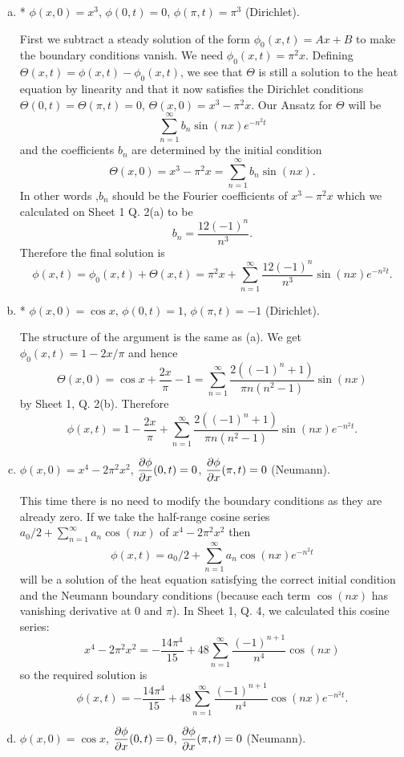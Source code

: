 \documentclass[12pt]{article}
\begin{document}
\iffalse
\begin{answer}
\begin{enumerate}[(a)]
\item * $\phi(x,0)=x^3$, $\phi(0,t)=0$, $\phi(\pi,t)=\pi^3$ (Dirichlet).

First we subtract a steady solution of the form $\phi_0(x,t)=Ax+B$ to make the boundary conditions vanish. We need $\phi_0(x,t)=\pi^2x$. Defining $\Theta(x,t)=\phi(x,t)-\phi_0(x,t)$, we see that $\Theta$ is still a solution to the heat equation by linearity and that it now satisfies the Dirichlet conditions $\Theta(0,t)=\Theta(\pi,t)=0$, $\Theta(x,0)=x^3-\pi^2x$.
Our Ansatz for $\Theta$ will be
\[\sum_{n=1}^{\infty}b_n\sin(nx)e^{-n^2t}\]
and the coefficients $b_n$ are determined by the initial condition
\[\Theta(x,0)=x^3-\pi^2x=\sum_{n=1}^{\infty}b_n\sin(nx).\]
In other words ,$b_n$ should be the Fourier coefficients of $x^3-\pi^2x$ which we calculated on Sheet 1 Q. 2(a) to be
\[b_n=\frac{12(-1)^n}{n^3}.\]
Therefore the final solution is
\[\phi(x,t)=\phi_0(x,t)+\Theta(x,t)=\pi^2x+\sum_{n=1}^{\infty}\frac{12(-1)^n}{n^3}\sin(nx)e^{-n^2t}.\]
\item * $\phi(x,0)=\cos x$, $\phi(0,t)=1$, $\phi(\pi,t)=-1$ (Dirichlet).

The structure of the argument is the same as (a). We get $\phi_0(x,t)=1-2x/\pi$ and hence
\[\Theta(x,0)=\cos x+\frac{2x}{\pi}-1=\sum_{n=1}^{\infty}\frac{2((-1)^n+1)}{\pi n(n^2-1)}\sin(nx)\]
by Sheet 1, Q. 2(b). Therefore
\[\phi(x,t)=1-\frac{2x}{\pi}+\sum_{n=1}^{\infty}\frac{2((-1)^n+1)}{\pi n(n^2-1)}\sin(nx)e^{-n^2t}.\]
\item $\phi(x,0)=x^4-2\pi^2 x^2$, $\dfrac{\partial \phi}{\partial x}(0,t)=0$, $\dfrac{\partial \phi}{\partial x}(\pi,t)=0$ (Neumann).

This time there is no need to modify the boundary conditions as they are already zero. If we take the half-range cosine series $a_0/2+\sum_{n=1}^{\infty}a_n\cos(nx)$ of $x^4-2\pi^2x^2$ then
\[\phi(x,t)=a_0/2+\sum_{n=1}^{\infty}a_n\cos(nx)e^{-n^2t}\]
will be a solution of the heat equation satisfying the correct initial condition and the Neumann boundary conditions (because each term $\cos(nx)$ has vanishing derivative at $0$ and $\pi$). In Sheet 1, Q. 4, we calculated this cosine series:
\[x^4-2\pi^2x^2=-\frac{14\pi^4}{15}+48\sum_{n=1}^{\infty}\frac{(-1)^{n+1}}{n^4}\cos(nx)\]
so the required solution is
\[\phi(x,t)=-\frac{14\pi^4}{15}+48\sum_{n=1}^{\infty}\frac{(-1)^{n+1}}{n^4}\cos(nx)e^{-n^2t}.\]
\item $\phi(x,0)=\cos x$, $\dfrac{\partial \phi}{\partial x}(0,t)=0$, $\dfrac{\partial \phi}{\partial x}(\pi,t)=0$ (Neumann).


\end{enumerate}
\end{answer}
\end{document}
